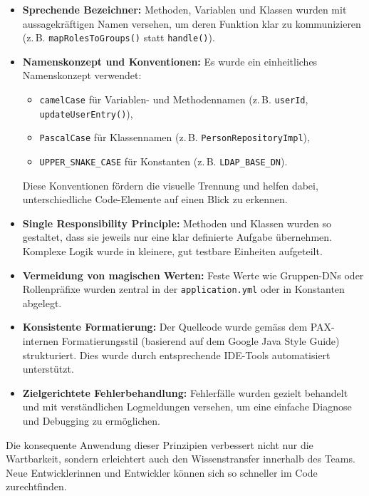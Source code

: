 \begin{itemize}
  \item \textbf{Sprechende Bezeichner:} Methoden, Variablen und Klassen wurden mit aussagekräftigen Namen versehen, um deren Funktion klar zu kommunizieren (z.\,B. \texttt{mapRolesToGroups()} statt \texttt{handle()}).
  
  \item \textbf{Namenskonzept und Konventionen:} Es wurde ein einheitliches Namenskonzept verwendet:
  \begin{itemize}
    \item \texttt{camelCase} für Variablen- und Methodennamen (z.\,B. \texttt{userId}, \texttt{updateUserEntry()}),
    \item \texttt{PascalCase} für Klassennamen (z.\,B. \texttt{PersonRepositoryImpl}),
    \item \texttt{UPPER\_SNAKE\_CASE} für Konstanten (z.\,B. \texttt{LDAP\_BASE\_DN}).
  \end{itemize}
  Diese Konventionen fördern die visuelle Trennung und helfen dabei, unterschiedliche Code-Elemente auf einen Blick zu erkennen.

  \item \textbf{Single Responsibility Principle:} Methoden und Klassen wurden so gestaltet, dass sie jeweils nur eine klar definierte Aufgabe übernehmen. Komplexe Logik wurde in kleinere, gut testbare Einheiten aufgeteilt.

  \item \textbf{Vermeidung von magischen Werten:} Feste Werte wie Gruppen-DNs oder Rollenpräfixe wurden zentral in der \texttt{application.yml} oder in Konstanten abgelegt.

  \item \textbf{Konsistente Formatierung:} Der Quellcode wurde gemäss dem PAX-internen Formatierungsstil (basierend auf dem Google Java Style Guide) strukturiert. Dies wurde durch entsprechende IDE-Tools automatisiert unterstützt.

  \item \textbf{Zielgerichtete Fehlerbehandlung:} Fehlerfälle wurden gezielt behandelt und mit verständlichen Logmeldungen versehen, um eine einfache Diagnose und Debugging zu ermöglichen.
\end{itemize}

Die konsequente Anwendung dieser Prinzipien verbessert nicht nur die Wartbarkeit, sondern erleichtert auch den Wissenstransfer innerhalb des Teams. Neue Entwicklerinnen und Entwickler können sich so schneller im Code zurechtfinden.
